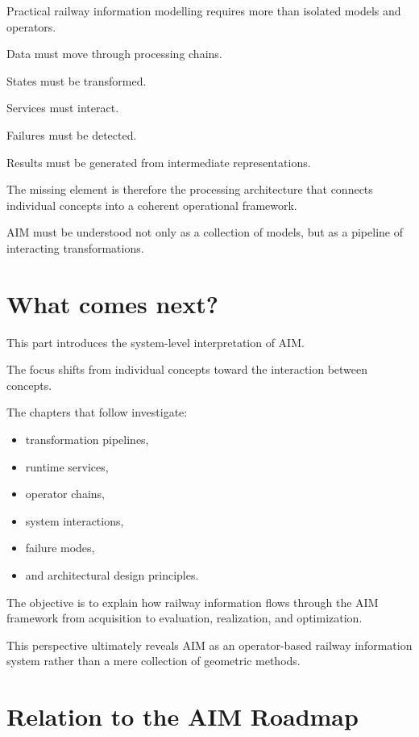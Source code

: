 Practical railway information modelling requires more than isolated
models and operators.

Data must move through processing chains.

States must be transformed.

Services must interact.

Failures must be detected.

Results must be generated from intermediate representations.

The missing element is therefore the processing architecture that
connects individual concepts into a coherent operational framework.

AIM must be understood not only as a collection of models, but as a
pipeline of interacting transformations.

\section*{What comes next?}

This part introduces the system-level interpretation of AIM.

The focus shifts from individual concepts toward the interaction
between concepts.

The chapters that follow investigate:
\begin{itemize}
\item transformation pipelines,
\item runtime services,
\item operator chains,
\item system interactions,
\item failure modes,
\item and architectural design principles.
\end{itemize}

The objective is to explain how railway information flows through the
AIM framework from acquisition to evaluation, realization, and
optimization.

This perspective ultimately reveals AIM as an operator-based railway
information system rather than a mere collection of geometric methods.

\section*{Relation to the AIM Roadmap}

